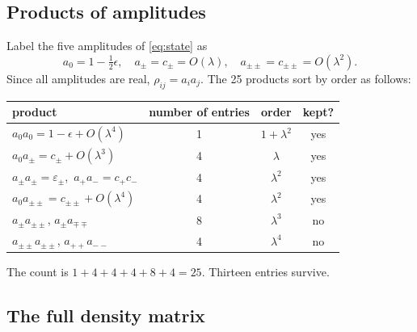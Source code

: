 \documentclass[preprint,12pt]{elsarticle}
\begin{document}
\subsection{Products of amplitudes}

Label the five amplitudes of \eqref{eq:state} as
\begin{equation}
a_{0}=1-\tfrac12\epsilon,\quad a_{\pm}=c_{\pm}=O(\lambda),\quad
a_{\pm\pm}=c_{\pm\pm}=O(\lambda^{2}).
\end{equation}
Since all amplitudes are real, $\rho_{ij}=a_{i}a_{j}$. The 25 products sort by
order as follows:

\begin{center}
\renewcommand{\arraystretch}{1.3}
\begin{tabular}{lccc}
\toprule
product & number of entries & order & kept?\\
\midrule
$a_{0}a_{0}=1-\epsilon+O(\lambda^{4})$ & 1 & $1+\lambda^{2}$ & yes\\
$a_{0}a_{\pm}=c_{\pm}+O(\lambda^{3})$ & 4 & $\lambda$ & yes\\
$a_{\pm}a_{\pm}=\varepsilon_{\pm}$,\ $a_{+}a_{-}=c_{+}c_{-}$ & 4 & $\lambda^{2}$ & yes\\
$a_{0}a_{\pm\pm}=c_{\pm\pm}+O(\lambda^{4})$ & 4 & $\lambda^{2}$ & yes\\
$a_{\pm}a_{\pm\pm}$, $a_{\pm}a_{\mp\mp}$ & 8 & $\lambda^{3}$ & no\\
$a_{\pm\pm}a_{\pm\pm}$, $a_{++}a_{--}$ & 4 & $\lambda^{4}$ & no\\
\bottomrule
\end{tabular}
\end{center}

\noindent The count is $1+4+4+4+8+4=25$. Thirteen entries survive.

\subsection{The full density matrix}
\end{document}
